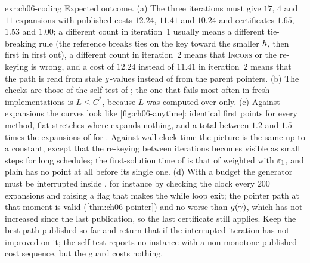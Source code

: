 \begin{solution}{exr:ch06-coding}
Expected outcome. (a) The three iterations must give $17$, $4$ and $11$ expansions with published costs $12.24$, $11.41$ and $10.24$ and certificates $1.65$, $1.53$ and $1.00$; a different count in iteration~1 usually means a different tie-breaking rule (the reference breaks ties on the key toward the smaller $h$, then first in first out), a different count in iteration~2 means that \textsc{Incons} or the re-keying is wrong, and a cost of $12.24$ instead of $11.41$ in iteration~2 means that the path is read from stale $g$-values instead of from the parent pointers. (b) The checks are those of the self-test of ; the one that fails most often in fresh implementations is $L \le C^*$, because $L$ was computed over \Open only. (c) Against expansions the curves look like \cref{fig:ch06-anytime}: identical first points for every method, flat stretches where \arastar expands nothing, and a total between $1.2$ and $1.5$ times the expansions of \astar for \arastar. Against wall-clock time the picture is the same up to a constant, except that the re-keying between iterations becomes visible as small steps for long schedules; the first-solution time of \arastar is that of weighted \astar with $\varepsilon_1$, and plain \astar has no point at all before its single one. (d) With a budget the generator must be interrupted inside , for instance by checking the clock every $200$ expansions and raising a flag that makes the while loop exit; the pointer path at that moment is valid (\cref{thm:ch06-pointer}) and no worse than $g(\gamma)$, which has not increased since the last publication, so the last certificate still applies. Keep the best path published so far and return that if the interrupted iteration has not improved on it; the self-test reports no instance with a non-monotone published cost sequence, but the guard costs nothing.
\end{solution}

